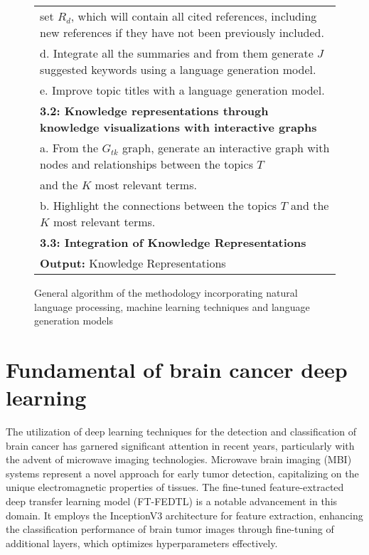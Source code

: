 \documentclass[runningheads]{llncs}
\begin{document}
\begin{figure*}[!h]
{\begin{tabular}{l}
			\quad \quad \quad set $R_d$, which will contain all cited references, including new references if they have not been previously included.\\
			\quad \quad d. Integrate all the summaries and from them generate $J$ suggested keywords using a language generation model.\\
			\quad \quad e. Improve topic titles with a language generation model.\\
			\quad \textbf{3.2: Knowledge representations through knowledge visualizations with interactive graphs}\\
			\quad \quad a. From the $G_{tk}$ graph, generate an interactive graph with nodes and relationships between the topics $T$\\
			\quad \quad and the $K$ most relevant terms.\\
			\quad \quad b. Highlight the connections between the topics $T$ and the $K$ most relevant terms.\\
			\quad \textbf{3.3: Integration of Knowledge Representations}\\
			\hline
			\textbf{Output:} Knowledge Representations \\
			\hline
		\end{tabular}
	}
	\caption{\centering General algorithm of the methodology incorporating natural language processing, machine learning techniques and language generation models}
	\label{tab:Algorithm}
\end{figure*}

\FloatBarrier


\section{Fundamental of brain cancer deep learning}
The utilization of deep learning techniques for the detection and classification of brain cancer has garnered significant attention in recent years, particularly with the advent of microwave imaging technologies. Microwave brain imaging (MBI) systems represent a novel approach for early tumor detection, capitalizing on the unique electromagnetic properties of tissues. The fine-tuned feature-extracted deep transfer learning model (FT-FEDTL) is a notable advancement in this domain. It employs the InceptionV3 architecture for feature extraction, enhancing the classification performance of brain tumor images through fine-tuning of additional layers, which optimizes hyperparameters effectively.
\end{document}
